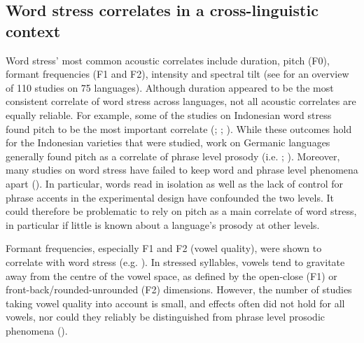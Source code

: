 \subsection{Word stress correlates in a cross-linguistic context} \label{sec213}
Word stress' most common acoustic correlates include duration, pitch (F0), formant frequencies (F1 and F2), intensity and spectral tilt (see \citealt{gordon_acoustic_2017} for an overview of 110 studies on 75 languages). Although duration appeared to be the most consistent correlate of word stress across languages, not all acoustic correlates are equally reliable. For example, some of the studies on Indonesian word stress found pitch to be the most important correlate (\citealt{halim_intonation_1981}; \citealt{laksman_location_1994}; \citealt{roosman_melodic_2007}). While these outcomes hold for the Indonesian varieties that were studied, work on Germanic languages generally found pitch as a correlate of phrase level prosody (i.e. \citealt{bolinger_theory_1958}; \citealt{sluijter_spectral_1996}). Moreover, many studies on word stress have failed to keep word and phrase level phenomena apart (\citealt{roettger_methodological_2017}). In particular, words read in isolation as well as the lack of control for phrase accents in the experimental design have confounded the two levels. It could therefore be problematic to rely on pitch as a main correlate of word stress, in particular if little is known about a language's prosody at other levels. \par

Formant frequencies, especially F1 and F2 (vowel quality), were shown to correlate with word stress (e.g. \citealt{crosswhite_vowel_2004}). In stressed syllables, vowels tend to gravitate away from the centre of the vowel space, as defined by the open-close (F1) or front-back/rounded-unrounded (F2) dimensions. However, the number of studies taking vowel quality into account is small, and effects often did not hold for all vowels, nor could they reliably be distinguished from phrase level prosodic phenomena (\citealt{gordon_acoustic_2017}).\par

